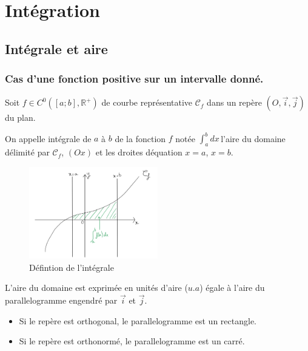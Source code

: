 \chapter{Intégration}
\section{Intégrale et aire}
\subsection{Cas d'une fonction positive sur un intervalle donné.}

\begin{definition}[Intégrale]
    Soit \(f \in C^{0}(\left[ a;b \right], \mathbb{R}^{+})\) de courbe représentative \(\mathcal{C}_{f}\) dans un repère \((O,\vec{i},\vec{j})\) du plan. \par
    On appelle intégrale de \(a\) à \(b\) de la fonction \(f\) notée \( \int_{a}^{b} dx \,\)l'aire du domaine délimité par \(\mathcal{C}_{f}\), \((Ox)\) et les droites déquation \(x=a\), \(x=b\).

\end{definition}

\begin{figure}[!htb]
\centering
\includegraphics[width=0.5\textwidth]{SCHEMA-1.png}
\caption{Défintion de l'intégrale}
\label{fig:SCHEMA-1}
\end{figure}


\begin{remark}[Unités]
    L'aire du domaine est exprimée en unités d'aire (\(u.a\)) égale à l'aire du parallelogramme engendré par \(\vec{i}\) et \(\vec{j}\).\par
    \begin{itemize}
        \item Si le repère est orthogonal, le parallelogramme est un rectangle. 
        \item Si le repère est orthonormé, le parallelogramme est un carré.
    \end{itemize}
\end{remark}

